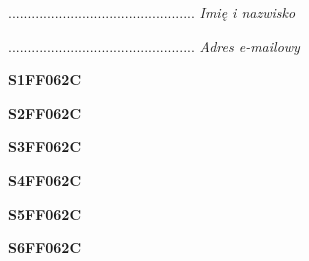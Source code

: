 \begin{turn}{90}\begin{minipage}{\linewidth} \vspace{20mm} ................................................  \textit{Imię i nazwisko}\end{minipage}\end{turn}

\begin{turn}{90}\begin{minipage}{\linewidth} \vspace{20mm} ................................................  \textit{Adres e-mailowy}\end{minipage}\end{turn}

\begin{turn}{90}\huge \begin{minipage}{\linewidth} \vspace{10mm}\textbf{S1FF062C}\end{minipage}\end{turn}

\begin{turn}{90}\huge \begin{minipage}{\linewidth} \vspace{10mm}\textbf{S2FF062C}\end{minipage}\end{turn}

\begin{turn}{90}\huge \begin{minipage}{\linewidth} \vspace{10mm}\textbf{S3FF062C}\end{minipage}\end{turn}

\begin{turn}{90}\huge \begin{minipage}{\linewidth} \vspace{10mm}\textbf{S4FF062C}\end{minipage}\end{turn}

\begin{turn}{90}\huge \begin{minipage}{\linewidth} \vspace{10mm}\textbf{S5FF062C}\end{minipage}\end{turn}

\begin{turn}{90}\huge \begin{minipage}{\linewidth} \vspace{10mm}\textbf{S6FF062C}\end{minipage}\end{turn}

